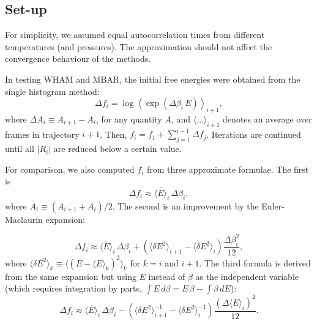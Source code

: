 \documentclass{gMOS2e}
\begin{document}
\subsection{\label{sec:results_setup}
Set-up}



For simplicity,
we assumed equal autocorrelation times
from different temperatures (and pressures).
%
The approximation should not affect
the convergence behaviour of the methods.



In testing WHAM and MBAR,
the initial free energies were obtained from
the single histogram method:
%
\begin{equation*}
\Delta f_i
=
\log
\left\langle
  \exp\left(
    \Delta \beta_i \, E
  \right)
\right\rangle_{i+1},
\end{equation*}
%
where $\Delta A_i \equiv A_{i+1} - A_i$,
for any quantity $A$,
and
$\langle\dots\rangle_{i + 1}$
denotes an average over frames in trajectory $i + 1$.
%
Then, $f_i = f_1 + \sum_{j = 1}^{i - 1} \Delta f_j$.
%
%
Iterations are continued
until all $|R_i|$ are reduced
below a certain value.



For comparison,
we also computed $f_i$
from three approximate formulae.
%
The first is\cite{park2007}
%
\begin{equation}
\Delta f_i
\approx
\overline{ \langle E \rangle }_i \, \Delta \beta_i,
\label{eq:df_eav}
\end{equation}
where
$\overline{ A }_i \equiv (A_{i+1} + A_i)/2$.
%
The second is an improvement by the
Euler-Maclaurin expansion\cite{
arfken, abramowitz, wang_specfunc, whittaker}:

%
\begin{equation}
\Delta f_i
\approx
\overline{ \langle E \rangle }_i \, \Delta \beta_i
+
\left(
  \langle \delta E^2 \rangle_{i+1}
-
  \langle \delta E^2 \rangle_i
\right)
\frac{ \Delta \beta_i^2 }{ 12 },
\label{eq:df_eavb}
\end{equation}
%
where
$\langle \delta E^2 \rangle_k
\equiv \langle (E - \langle E \rangle_k)^2 \rangle_k$
for $k = i$ and $i + 1$.
%
%
The third formula is derived from the same expansion
but using $E$ instead of $\beta$ as the independent variable
(which requires integration by parts,
$\int E \, d\beta = E \, \beta - \int \beta \, dE$):
%
\begin{equation}
\Delta f_i
\approx
\overline{ \langle E \rangle }_i \, \Delta \beta_i
-
\left(
  \langle \delta E^2 \rangle_{i+1}^{-1}
-
  \langle \delta E^2 \rangle_i^{-1}
\right)
\frac{ \left( \Delta \langle E \rangle_i \right)^2 }{ 12 }.
\label{eq:df_tg}
\end{equation}
\end{document}
